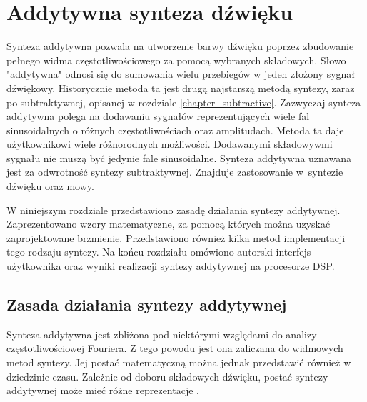 \chapter{Addytywna synteza dźwięku}\label{chapter_additive}
Synteza addytywna pozwala na utworzenie barwy dźwięku poprzez zbudowanie pełnego widma częstotliwościowego za pomocą wybranych składowych. Słowo "addytywna" odnosi się do sumowania wielu przebiegów w jeden złożony sygnał dźwiękowy. Historycznie metoda ta jest drugą najstarszą metodą syntezy, zaraz po subtraktywnej, opisanej w rozdziale \ref{chapter_subtractive}.
Zazwyczaj synteza addytywna polega na dodawaniu sygnałów reprezentujących wiele fal sinusoidalnych o różnych częstotliwościach oraz amplitudach. Metoda ta daje użytkownikowi wiele różnorodnych możliwości. Dodawanymi składowywmi sygnału nie muszą być jedynie fale sinusoidalne.
Synteza addytywna uznawana jest za odwrotność syntezy subtraktywnej. Znajduje zastosowanie w~syntezie dźwięku oraz mowy.

W niniejszym rozdziale przedstawiono zasadę działania syntezy addytywnej. Zaprezentowano wzory matematyczne, za pomocą których można uzyskać zaprojektowane brzmienie. Przedstawiono również kilka metod implementacji tego rodzaju syntezy. Na końcu rozdziału omówiono autorski interfejs użytkownika oraz wyniki realizacji syntezy addytywnej na procesorze DSP.

\section{Zasada działania syntezy addytywnej}
Synteza addytywna jest zbliżona pod niektórymi względami do analizy częstotliwościowej Fouriera. Z tego powodu jest ona zaliczana do widmowych metod syntezy. Jej postać matematyczną można jednak przedstawić również w dziedzinie czasu. Zależnie od doboru składowych dźwięku, postać syntezy addytywnej może mieć różne reprezentacje \cite{add_defins}.

